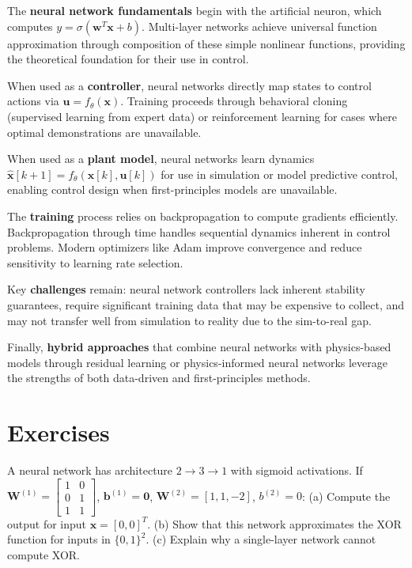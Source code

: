 The \textbf{neural network fundamentals} begin with the artificial neuron, which computes $y = \sigma(\mathbf{w}^T\mathbf{x} + b)$. Multi-layer networks achieve universal function approximation through composition of these simple nonlinear functions, providing the theoretical foundation for their use in control.

When used as a \textbf{controller}, neural networks directly map states to control actions via $\mathbf{u} = f_\theta(\mathbf{x})$. Training proceeds through behavioral cloning (supervised learning from expert data) or reinforcement learning for cases where optimal demonstrations are unavailable.

When used as a \textbf{plant model}, neural networks learn dynamics $\hat{\mathbf{x}}[k+1] = f_\theta(\mathbf{x}[k], \mathbf{u}[k])$ for use in simulation or model predictive control, enabling control design when first-principles models are unavailable.

The \textbf{training} process relies on backpropagation to compute gradients efficiently. Backpropagation through time handles sequential dynamics inherent in control problems. Modern optimizers like Adam improve convergence and reduce sensitivity to learning rate selection.

Key \textbf{challenges} remain: neural network controllers lack inherent stability guarantees, require significant training data that may be expensive to collect, and may not transfer well from simulation to reality due to the sim-to-real gap.

Finally, \textbf{hybrid approaches} that combine neural networks with physics-based models through residual learning or physics-informed neural networks leverage the strengths of both data-driven and first-principles methods.


\newpage
\section{Exercises}

\begin{exercise}
A neural network has architecture $2 \to 3 \to 1$ with sigmoid activations. If $\mathbf{W}^{(1)} = \begin{bmatrix} 1 & 0 \\ 0 & 1 \\ 1 & 1 \end{bmatrix}$, $\mathbf{b}^{(1)} = \mathbf{0}$, $\mathbf{W}^{(2)} = [1, 1, -2]$, $b^{(2)} = 0$:
(a) Compute the output for input $\mathbf{x} = [0, 0]^T$.
(b) Show that this network approximates the XOR function for inputs in $\{0, 1\}^2$.
(c) Explain why a single-layer network cannot compute XOR.
\end{exercise}

